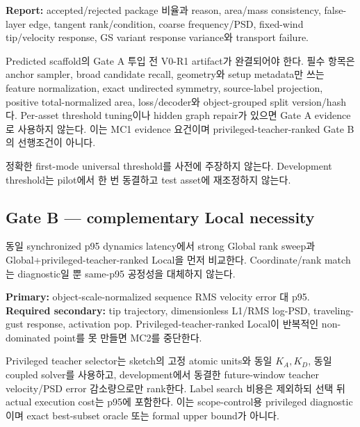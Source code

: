 \documentclass[10pt]{article}
\newcommand{\must}[1]{\textcolor{CoreBlue}{\textbf{#1}}}
\begin{document}
\must{Report:} accepted/rejected package 비율과 reason, area/mass consistency,
false-layer edge, tangent rank/condition, coarse frequency/PSD, fixed-wind tip/velocity response,
GS variant response variance와 transport failure.

Predicted scaffold의 Gate A 투입 전 V0-R1 artifact가 완결되어야 한다.
필수 항목은 anchor sampler, broad candidate recall, geometry와 setup metadata만 쓰는 feature normalization,
exact undirected symmetry, source-label projection, positive total-normalized area,
loss/decoder와 object-grouped split version/hash다.
Per-asset threshold tuning이나 hidden graph repair가 있으면 Gate A evidence로 사용하지 않는다.
이는 MC1 evidence 요건이며 privileged-teacher-ranked Gate B의 선행조건이 아니다.

정확한 first-mode universal threshold를 사전에 주장하지 않는다.
Development threshold는 pilot에서 한 번 동결하고 test asset에 재조정하지 않는다.

\subsection{Gate B --- complementary Local necessity}

동일 synchronized p95 dynamics latency에서 strong Global rank sweep과
Global+privileged-teacher-ranked Local을 먼저 비교한다. Coordinate/rank match는 diagnostic일 뿐
same-p95 공정성을 대체하지 않는다.

\must{Primary:} object-scale-normalized sequence RMS velocity error 대 p95.
\must{Required secondary:} tip trajectory, dimensionless L1/RMS log-PSD, traveling-gust response,
activation pop. Privileged-teacher-ranked Local이 반복적인 non-dominated point를 못 만들면 MC2를 중단한다.

Privileged teacher selector는 sketch의 고정 atomic units와 동일 \(K_A,K_D\), 동일 coupled solver를 사용하고,
development에서 동결한 future-window teacher velocity/PSD error 감소량으로만 rank한다.
Label search 비용은 제외하되 선택 뒤 actual execution cost는 p95에 포함한다.
이는 scope-control용 privileged diagnostic이며 exact best-subset oracle 또는 formal upper bound가 아니다.
\end{document}
